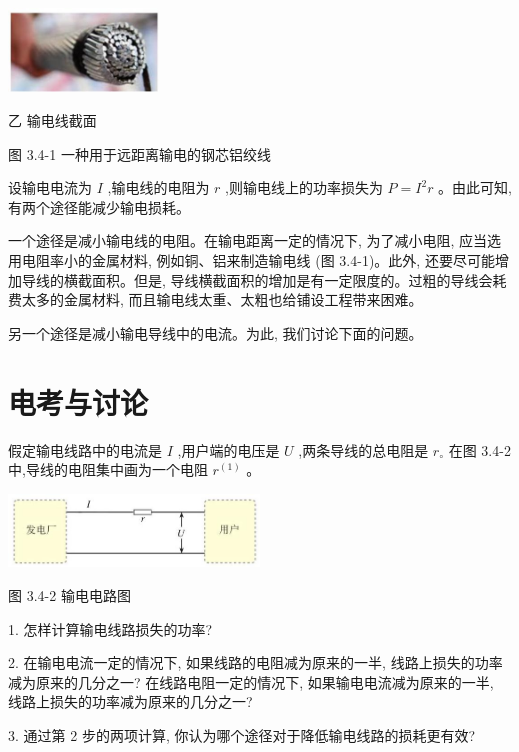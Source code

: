 \documentclass[10pt]{article}
\begin{document}
\begin{center}
\includegraphics[max width=0.3\textwidth]{images/01910e72-c5b7-7ed5-a6d4-fb3a5faefc32_68_272977.jpg}
\end{center}

乙 输电线截面

图 3.4-1 一种用于远距离输电的钢芯铝绞线

设输电电流为 \(I\) ,输电线的电阻为 \(r\) ,则输电线上的功率损失为 \(P = {I}^{2}r\) 。由此可知,有两个途径能减少输电损耗。

一个途径是减小输电线的电阻。在输电距离一定的情况下, 为了减小电阻, 应当选用电阻率小的金属材料, 例如铜、铝来制造输电线 (图 3.4-1)。此外, 还要尽可能增加导线的横截面积。但是, 导线横截面积的增加是有一定限度的。过粗的导线会耗费太多的金属材料, 而且输电线太重、太粗也给铺设工程带来困难。

另一个途径是减小输电导线中的电流。为此, 我们讨论下面的问题。

\section*{电考与讨论}

假定输电线路中的电流是 \(I\) ,用户端的电压是 \(U\) ,两条导线的总电阻是 \({r}_{ \circ }\) 在图 3.4-2 中,导线的电阻集中画为一个电阻 \({r}^{\left( 1\right) }\) 。

\begin{center}
\includegraphics[max width=0.5\textwidth]{images/01910e72-c5b7-7ed5-a6d4-fb3a5faefc32_69_647629.jpg}
\end{center}

图 3.4-2 输电电路图

1. 怎样计算输电线路损失的功率?

2. 在输电电流一定的情况下, 如果线路的电阻减为原来的一半, 线路上损失的功率减为原来的几分之一? 在线路电阻一定的情况下, 如果输电电流减为原来的一半, 线路上损失的功率减为原来的几分之一?

3. 通过第 2 步的两项计算, 你认为哪个途径对于降低输电线路的损耗更有效?
\end{document}
